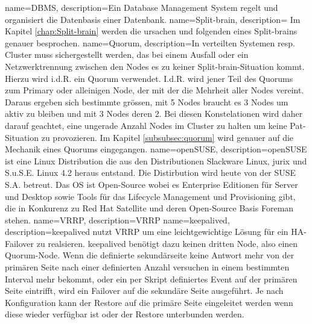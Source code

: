 {
        name=DBMS,
        description={Ein Database Management System regelt und organisiert die Datenbasis einer Datenbank\cite{8XWD67EM}.}
}
{
        name=Split-brain,
        description={
%        
        Im Kapitel \autoref{chap:Split-brain} werden die ursachen und folgenden eines Split-brains genauer besprochen.
        }
}
{
        name=Quorum,
        description={In verteilten Systemen resp. Cluster muss sichergestellt werden, das bei einem Ausfall oder ein Netzwerktrennung zwischen den Nodes es zu keiner \Gls{Split-brain}-Situation kommt.
        Hierzu wird i.d.R. ein Quorum verwendet.
        I.d.R. wird jener Teil des Quorums zum Primary oder alleinigen Node, der mit der die Mehrheit aller Nodes vereint. Daraus ergeben sich bestimmte grössen, mit 5 Nodes braucht es 3 Nodes um aktiv zu bleiben und mit 3 Nodes deren 2.
        Bei diesen Konstelationen wird daher darauf geachtet, eine ungerade Anzahl Nodes im Cluster zu halten um keine Pat-Situation zu provozieren.
%        
        Im Kapitel \autoref{subsubsec:quorum} wird genauer auf die Mechanik eines Quorums eingegangen.
        }
}
{
        name=openSUSE,
        description={openSUSE ist eine Linux Distribution die aus den Distributionen Slackware Linux, jurix und S.u.S.E. Linux 4.2 heraus entstand.
        Die Distirbution wird heute von der SUSE S.A. betreut.
        Das OS ist Open-Source wobei es Enterprise Editionen für Server und Desktop sowie Tools für das Lifecycle Management und Provisioning gibt,
        die in Konkurenz zu Red Hat Satellite und deren Open-Source Basis \Gls{Foreman} stehen.}
}
{
        name=VRRP,
        description={VRRP }
}
{
        name=keepalived,
        description={keepalived nutzt \Gls{VRRP} um eine leichtgewichtige Lösung für ein HA-\Gls{Failover} zu realsieren.
        keepalived benötigt dazu keinen dritten Node, also einen \Gls{Quorum}-Node.
        Wenn die definierte sekundärseite keine Antwort mehr von der primären Seite nach einer definierten Anzahl versuchen in einem bestimmten Interval mehr bekommt,
        oder ein per Skript definiertes Event auf der primären Seite eintrifft, wird ein \Gls{Failover} auf die sekundäre Seite ausgeführt.
        Je nach Konfiguration kann der Restore auf die primäre Seite eingeleitet werden wenn diese wieder verfügbar ist oder der Restore unterbunden werden\cite{5IP362SV,ZW4PA3EQ}.}
}
